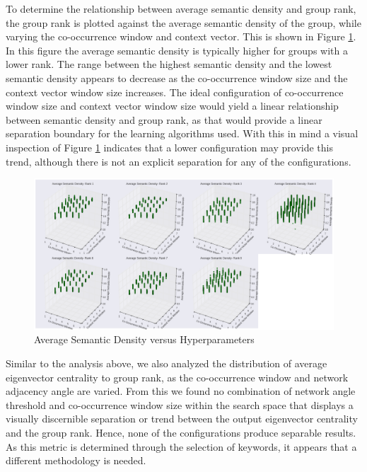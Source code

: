 \documentclass[11pt, a4paper]{article}
\begin{document}
To determine the relationship between average semantic density and group rank, the group rank is plotted against the average semantic density of the group, while varying the co-occurrence window and context vector.  This is shown in Figure \ref{fig:multipleAVGSD}.  In this figure the average semantic density is typically higher for groups with a lower rank. The range between the highest semantic density and the lowest semantic density appears to decrease as the co-occurrence window size and the context vector window size increases. The ideal configuration of co-occurrence window size and context vector window size would yield a linear relationship between semantic density and group rank, as that would provide a linear separation boundary for the learning algorithms used. With this in mind a visual inspection of Figure \ref{fig:multipleAVGSD} indicates that a lower configuration may provide this trend, although there is not an explicit separation for any of the configurations.

\begin{figure}[!h]
\begin{center}
\includegraphics[width = \textwidth]{figs/multipleAVGSD}
\caption{Average Semantic Density versus Hyperparameters}
\label{fig:multipleAVGSD}
\end{center}
\end{figure}

Similar to the analysis above, we also analyzed the distribution of average eigenvector centrality to group rank, as the co-occurrence window and network adjacency angle are varied. From this we found no combination of network angle threshold and co-occurrence window size within the search space that displays a visually discernible separation or trend between the output eigenvector centrality and the group rank. Hence, none of the configurations produce separable results. As this metric is determined through the selection of keywords, it appears that a different methodology is needed.
\end{document}
